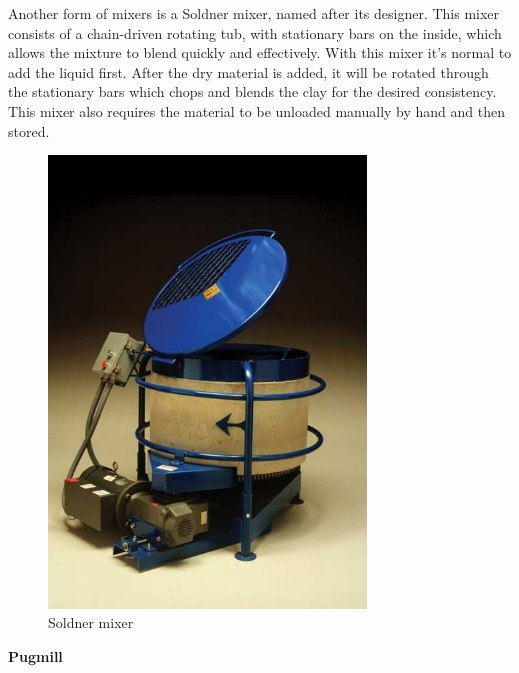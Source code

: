 \documentclass[12pt, a4paper]{article}
\begin{document}
Another form of mixers is a Soldner mixer, named after its designer. This mixer consists of a chain-driven rotating tub, with stationary bars on the inside, which allows the mixture to blend quickly and effectively. With this mixer it's normal to add the liquid first. After the dry material is added, it will be rotated through the stationary bars which chops and blends the clay for the desired consistency. This mixer also requires the material to be unloaded manually by hand and then stored.
\begin{figure}[H]
	\centering
	\includegraphics[height=12cm, keepaspectratio]{soldnermixer}
	\caption{Soldner mixer}
\end{figure}
	\newpage

\textbf{Pugmill}
\end{document}

